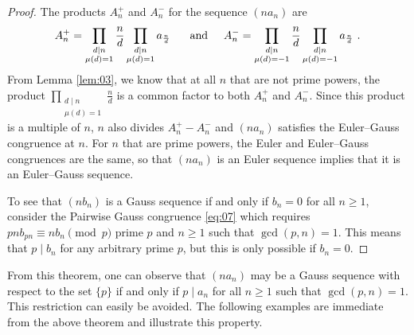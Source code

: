 \documentclass{article}
\numberwithin{equation}{section}
\theoremstyle{definition}
\begin{document}
\begin{proof}
    The products $A_n^+$ and $A_n^-$ for the sequence $(na_n)$ are
    \[A_n^+=\prod_{\substack{d\mid n\\\mu(d)=1}}\frac{n}{d}\prod_{\substack{d\mid n \\ \mu(d)=1}} a_{\frac{n}{d}}\text{ \hspace{5mm}and\hspace{5mm}}A_n^-=\prod_{\substack{d\mid n\\\mu(d)=-1}}\frac{n}{d}\prod_{\substack{d\mid n \\ \mu(d)=-1}} a_\frac{n}{d}\text{ .}\]
    From Lemma \ref{lem:03}, we know that at all $n$ that are not prime powers, the product $\prod_{\substack{d\mid n\\\mu(d)=1}}\frac{n}{d}$ is a common factor to both $A_n^+$ and $A_n^-$. Since this product is a multiple of $n$, $n$ also divides $A_n^+-A_n^-$ and $(na_n)$ satisfies the Euler--Gauss congruence at $n$. For $n$ that are prime powers, the Euler and Euler--Gauss congruences are the same, so that $(na_n)$ is an Euler sequence implies that it is an Euler--Gauss sequence.

    To see that $(nb_n)$ is a Gauss sequence if and only if $b_n=0$ for all $n\geq1$, consider the Pairwise Gauss congruence \eqref{eq:07} which requires $pnb_{pn}\equiv nb_n\pmod{p}$ prime $p$ and $n\geq1$ such that $\gcd(p,n)=1$. This means that $p\mid b_n$ for any arbitrary prime $p$, but this is only possible if $b_n=0$.
\end{proof}

From this theorem, one can observe that $(na_n)$ may be a Gauss sequence with respect to the set $\{p\}$ if and only if $p\mid a_n$ for all $n\geq1$ such that $\gcd(p,n)=1$. This restriction can easily be avoided. The following examples are immediate from the above theorem and illustrate this property.
\end{document}
